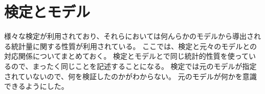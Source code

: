 \begin{comment}
\section{モデルの設定}
仮説検定とモデルに対応付ができるように、仮説の設定をモデルに言い換えて説明する。


帰無仮説$\mu=\mu_0$をを含む統計モデル$M(\mu_0)$を帰無モデル($M_{H_0}$)、対立仮説$\mu\neq \mu_0$を含む統計モデル$M(\mu\neq\mu_0)$を対立モデル($M_{H_1}$)と呼ぶ。
一般に、統計モデルの否定したい母数$\mu_0$を帰無仮説と言い、その母数ではないという$\mu\neq\mu_0$を対立かせつと言う。

具体的には、データがある特定の母数$\mu$をもつ統計モデルの信頼区間に含まれるか否かによって、統計モデルが棄却されるかを調べる。
\begin{itemize}
    \item i.i.d
    \item 数学関数
    \item 統計モデルの母数を$\mu$とし、$\mu=\mu_0$
\end{itemize}
一番最後の仮説が帰無仮説と言う。
対立仮説を含む統計モデル$M_1$は、$M_0$と同様の仮説(1),(2)から構成されまるが、仮説3は統計モデル$M_0$と$M_1$で異なる。
\begin{itemize}
    \item i.i.d
    \item 数学関数
    \item 統計モデルの母数を$\mu$とし、$\mu\neq\mu_0$
\end{itemize}
一番最後の仮説が対立仮説である。$M_1$の最後の仮説は、$M_0$の最後の仮説の否定系である。

二つの統計モデルを作って、$M_0$で計算される信頼区間に、データから得られる統計量が入らないなら、$M_0$は棄却される。
逆に、統計量が信頼区間に入るなら、$M_0$が採択されることはない。
分野によっては採択することがありうる。
このように、否定したい仮説を設定し、少なくとも帰無仮説を含む統計モデルがだめだったと判断する。


 
\end{comment}


\chapter{検定とモデル}
様々な検定が利用されており、それらにおいては何んらかのモデルから導出される統計量に関する性質が利用されている。
ここでは、検定と元々のモデルとの対応関係についてまとめておく。
検定とモデルとで同じ統計的性質を使っているので、まったく同じことを記述することになる。
検定では元のモデルが指定されていないので、何を検証したのかがわからない。
元のモデルが何かを意識できるようにした。

